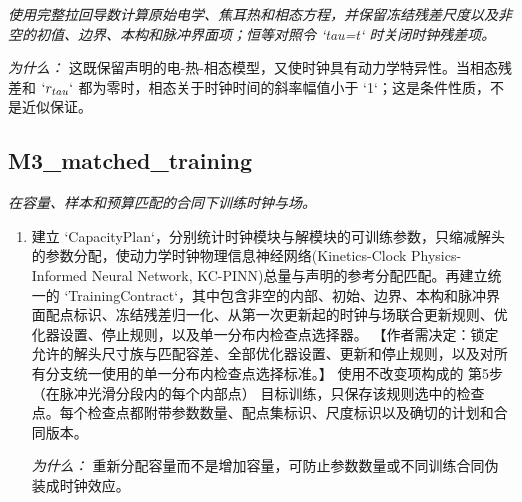 \documentclass[10pt,a4paper]{article}
\begin{document}
\begin{enumerate}[leftmargin=*,start=3]
\noindent\emph{使用完整拉回导数计算原始电学、焦耳热和相态方程，并保留冻结残差尺度以及非空的初值、边界、本构和脉冲界面项；恒等对照令 `tau=t` 时关闭时钟残差项。}
\par{}
\par\emph{为什么：} 这既保留声明的电-热-相态模型，又使时钟具有动力学特异性。当相态残差和 \(`r_{tau}`\) 都为零时，相态关于时钟时间的斜率幅值小于 `1`；这是条件性质，不是近似保证。
\end{enumerate}
\subsection*{M3\_matched\_training}
\emph{在容量、样本和预算匹配的合同下训练时钟与场。}
\begin{enumerate}[leftmargin=*,start=6]
  \item 建立 `CapacityPlan`，分别统计时钟模块与解模块的可训练参数，只缩减解头的参数分配，使动力学时钟物理信息神经网络(Kinetics-Clock Physics-Informed Neural Network, KC-PINN)总量与声明的参考分配匹配。再建立统一的 `TrainingContract`，其中包含非空的内部、初始、边界、本构和脉冲界面配点标识、冻结残差归一化、从第一次更新起的时钟与场联合更新规则、优化器设置、停止规则，以及单一分布内检查点选择器。 【作者需决定：锁定允许的解头尺寸族与匹配容差、全部优化器设置、更新和停止规则，以及对所有分支统一使用的单一分布内检查点选择标准。】 使用不改变项构成的 第5步（在脉冲光滑分段内的每个内部点） 目标训练，只保存该规则选中的检查点。每个检查点都附带参数数量、配点集标识、尺度标识以及确切的计划和合同版本。
\par\emph{为什么：} 重新分配容量而不是增加容量，可防止参数数量或不同训练合同伪装成时钟效应。
\end{enumerate}
\end{document}

